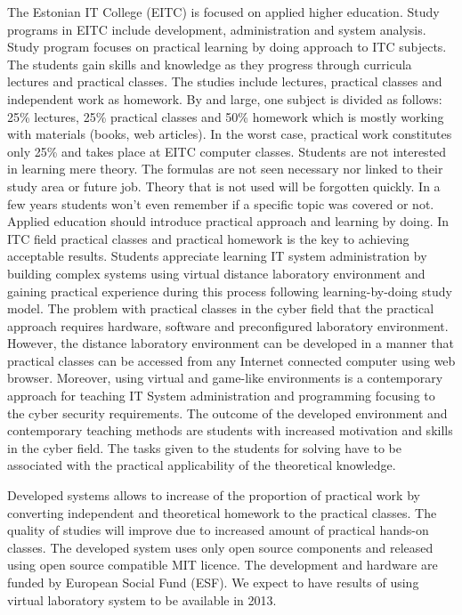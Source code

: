 The Estonian IT College (\gls{EITC}) is focused on applied higher education. Study programs in \gls{EITC} include development, administration and system analysis. Study program focuses on practical learning by doing approach to ITC subjects. The students gain skills and knowledge as they progress through curricula lectures and practical classes. The studies include lectures, practical classes and independent work as homework. By and large, one subject is divided as follows: 25\% lectures, 25\% practical classes and 50\% homework which is mostly working with materials (books, web articles). In the worst case, practical work constitutes only 25\% and takes place at \gls{EITC} computer classes. Students are not interested in learning mere theory. The formulas are not seen necessary nor linked to their study area or future job. Theory that is not used will be forgotten quickly. In a few years students won't even remember if a specific topic was covered or not. Applied education should introduce practical approach and learning by doing. In ITC field practical classes and practical homework is the key to achieving acceptable results. Students appreciate learning IT system administration by building complex systems using virtual distance laboratory environment and gaining practical experience during this process following learning-by-doing study model.
The problem with practical classes in the cyber field that the practical approach requires hardware, software and preconfigured laboratory environment. However, the  distance laboratory environment can be developed in a manner  that practical classes can be accessed from any Internet connected computer using web browser. Moreover, using virtual and game-like environments is a contemporary approach for teaching IT System administration and programming focusing to the cyber security requirements. The outcome of the developed environment and contemporary teaching methods are students with increased motivation and skills in the cyber field. The tasks given to the students for solving have to be associated with the practical applicability of the theoretical knowledge.

Developed systems allows to  increase of the proportion of practical work by converting independent and theoretical homework to  the practical classes. The quality of studies will improve due to increased amount of practical hands-on classes. The developed system uses only open source components and released using open source compatible MIT licence. The development and hardware are funded by European Social Fund (\gls{ESF}). We expect to have results of using virtual laboratory system to be available in 2013.




